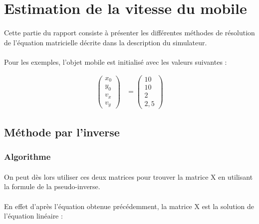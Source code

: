 \documentclass[a4paper,11pt]{article}
\begin{document}
	\newpage

	\section{Estimation de la vitesse du mobile}
		
		\paragraph{}
		Cette partie du rapport consiste à présenter les différentes méthodes de résolution de l'équation matricielle décrite dans la description du simulateur.

		\paragraph{}
		Pour les exemples, l'objet mobile est initialisé avec les valeurs suivantes :

		\begin{align}
			\begin{pmatrix}
			    x_0 \\
			    y_0 \\
			    v_x \\
			    v_y  
			\end{pmatrix}
			&=
			\begin{pmatrix}
			    10 \\
			    10 \\
			    2 \\
			    2,5
			\end{pmatrix}
		\end{align}

		\subsection{Méthode par l'inverse}

			\subsubsection{Algorithme}

			\paragraph{}
			On peut dès lors utiliser ces deux matrices pour trouver la matrice X en utilisant la formule de la pseudo-inverse.

			\paragraph{}
			En effet d'après l'équation obtenue précédemment, la matrice X est la solution de l'équation linéaire :
\end{document}

